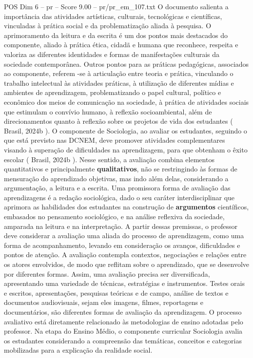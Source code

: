 \begin{textsample}{POS Dim 6 – pr – Score 9.00 – pr/pr\_em\_107.txt}
O documento salienta a importância das atividades artísticas, culturais, tecnológicas e científicas, vinculadas à prática social e da problematização aliada à pesquisa.
O aprimoramento da leitura e da escrita é um dos pontos mais destacados do componente, aliado à prática ética, cidadã e humana que reconhece, respeita e valoriza as diferentes identidades e formas de manifestações culturais da sociedade contemporânea.
Outros pontos para as práticas pedagógicas, associados ao componente, referem -se à articulação entre teoria e prática, vinculando o trabalho intelectual às atividades práticas, à utilização de diferentes mídias e ambientes de aprendizagem, problematizando o papel cultural, político e econômico dos meios de comunicação na sociedade, à prática de atividades sociais que estimulam o convívio humano, à reflexão socioambiental, além de direcionamentos quanto à reflexão sobre os projetos de vida dos estudantes ( Brasil, 2024b ).
O componente de Sociologia, ao avaliar os estudantes, seguindo o que está previsto nas DCNEM, deve promover atividades complementares visando à superação de dificuldades na aprendizagem, para que obtenham o êxito escolar ( Brasil, 2024b ).
Nesse sentido, a avaliação combina elementos quantitativos e principalmente \textbf{qualitativos}, não se restringindo às formas de mensuração do aprendizado objetivas, mas indo além delas, considerando a argumentação, a leitura e a escrita.
Uma promissora forma de avaliação das aprendizagens é a redação sociológica, dado o seu caráter interdisciplinar que aprimora as habilidades dos estudantes na construção de \textbf{argumentos} científicos, embasados no pensamento sociológico, e na análise reflexiva da sociedade, amparada na leitura e na interpretação.
A partir dessas premissas, o professor deve considerar a avaliação uma aliada do processo de aprendizagem, como uma forma de acompanhamento, levando em consideração os avanços, dificuldades e pontos de atenção.
A avaliação contempla contextos, negociações e relações entre os atores envolvidos, de modo que reflitam sobre o aprendizado, que se desenvolve por diferentes formas.
Assim, uma avaliação precisa ser diversificada, apresentando uma variedade de técnicas, estratégias e instrumentos.
Testes orais e escritos, apresentações, pesquisas teóricas e de campo, análise de textos e documentos audiovisuais, sejam eles imagens, filmes, reportagens e documentários, são diferentes formas de avaliação da aprendizagem.
O processo avaliativo está diretamente relacionado às metodologias de ensino adotadas pelo professor.
Na etapa do Ensino Médio, o componente curricular Sociologia avalia os estudantes considerando a compreensão das temáticas, conceitos e categorias mobilizadas para a explicação da realidade social.

\end{textsample}
